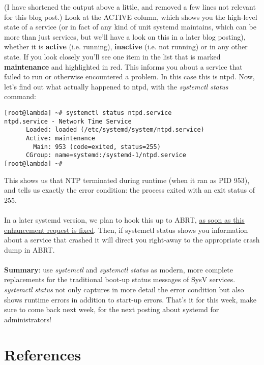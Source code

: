 \documentclass[titlepage]{article}
\begin{document}
(I have shortened the output above a little, and removed a few lines not relevant for this blog post.)
Look at the ACTIVE column, which shows you the high-level state of a service (or in fact of any kind of unit systemd maintains, which can be more than just services, but we'll have a look on this in a later blog posting), whether it is \textbf{active} (i.e. running), \textbf{inactive} (i.e. not running) or in any other state. If you look closely you'll see one item in the list that is marked \textbf{maintenance} and highlighted in red. This informs you about a service that failed to run or otherwise encountered a problem. In this case this is ntpd. Now, let's find out what actually happened to ntpd, with the \textit{systemctl status} command:
\begin{lstlisting}
[root@lambda] ~# systemctl status ntpd.service
ntpd.service - Network Time Service
      Loaded: loaded (/etc/systemd/system/ntpd.service)
      Active: maintenance
        Main: 953 (code=exited, status=255)
      CGroup: name=systemd:/systemd-1/ntpd.service
[root@lambda] ~#
\end{lstlisting}
This shows us that NTP terminated during runtime (when it ran as PID 953), and tells us exactly the error condition: the process exited with an exit status of 255.
\\
\\
In a later systemd version, we plan to hook this up to ABRT, \href{https://bugzilla.redhat.com/show_bug.cgi?id=622773}{as soon as this enhancement request is fixed}. Then, if systemctl status shows you information about a service that crashed it will direct you right-away to the appropriate crash dump in ABRT.
\\
\\
\textbf{Summary}: use \textit{systemctl} and \textit{systemctl status} as modern, more complete replacements for the traditional boot-up status messages of SysV services. \textit{systemctl status} not only captures in more detail the error condition but also shows runtime errors in addition to start-up errors.
That's it for this week, make sure to come back next week, for the next posting about systemd for administrators!
\section{References}
\nocite{*}


\end{document}
